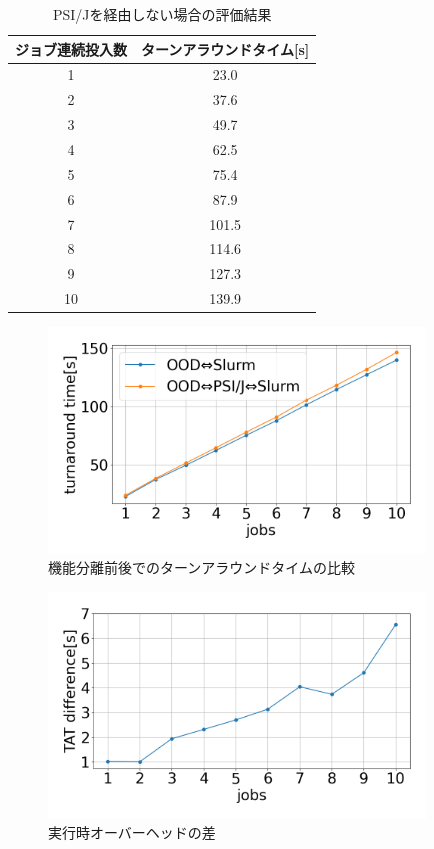 \begin{table}[tb]
    \centering
    \caption{PSI/Jを経由しない場合の評価結果}
    \begin{tabular}{|c|c|}
    \hline
    ジョブ連続投入数 & ターンアラウンドタイム{[}s{]} \\ \hline
    1        & 23.0               \\ \hline
    2        & 37.6               \\ \hline
    3        & 49.7               \\ \hline
    4        & 62.5               \\ \hline
    5        & 75.4               \\ \hline
    6        & 87.9               \\ \hline
    7        & 101.5              \\ \hline
    8        & 114.6              \\ \hline
    9        & 127.3              \\ \hline
    10       & 139.9              \\ \hline
    \end{tabular}
    \label{SLURM}
\end{table}

\begin{figure}[tb]
    \centering
    \includegraphics[width=100mm]{./fig/ave_1-20.png}
    \caption{機能分離前後でのターンアラウンドタイムの比較}
    \label{fig8}
\end{figure}
  
\begin{figure}[tb]
    \centering
    \includegraphics[width=100mm]{./fig/ave_diff_1-20.png}
    \caption{実行時オーバーヘッドの差}
    \label{fig9}
\end{figure}


